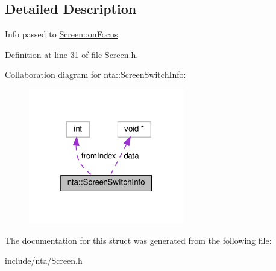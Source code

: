 \subsection{Detailed Description}
Info passed to \hyperlink{classnta_1_1Screen_a895548cdf2a5170d671983fc9189579a}{Screen\+::on\+Focus}. 

Definition at line 31 of file Screen.\+h.



Collaboration diagram for nta\+:\+:Screen\+Switch\+Info\+:
\nopagebreak
\begin{figure}[H]
\begin{center}
\leavevmode
\includegraphics[width=193pt]{d3/d86/structnta_1_1ScreenSwitchInfo__coll__graph}
\end{center}
\end{figure}


The documentation for this struct was generated from the following file\+:\begin{DoxyCompactItemize}
\item 
include/nta/Screen.\+h\end{DoxyCompactItemize}
